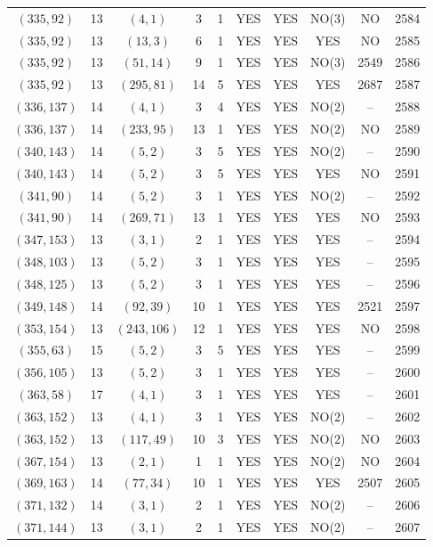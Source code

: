 \begin{longtable}{|c|c|c|c|c|c|c|c|c|c|}
$(335, 92)$ & 13 & $(4, 1)$ & 3 & 1 & YES & YES & NO(3) & NO & 2584\\
$(335, 92)$ & 13 & $(13, 3)$ & 6 & 1 & YES & YES & YES & NO & 2585\\
$(335, 92)$ & 13 & $(51, 14)$ & 9 & 1 & YES & YES & NO(3) & 2549 & 2586\\
$(335, 92)$ & 13 & $(295, 81)$ & 14 & 5 & YES & YES & YES & 2687 & 2587\\
$(336, 137)$ & 14 & $(4, 1)$ & 3 & 4 & YES & YES & NO(2) & -- & 2588\\
$(336, 137)$ & 14 & $(233, 95)$ & 13 & 1 & YES & YES & NO(2) & NO & 2589\\
$(340, 143)$ & 14 & $(5, 2)$ & 3 & 5 & YES & YES & NO(2) & -- & 2590\\
$(340, 143)$ & 14 & $(5, 2)$ & 3 & 5 & YES & YES & YES & NO & 2591\\
$(341, 90)$ & 14 & $(5, 2)$ & 3 & 1 & YES & YES & NO(2) & -- & 2592\\
$(341, 90)$ & 14 & $(269, 71)$ & 13 & 1 & YES & YES & YES & NO & 2593\\
$(347, 153)$ & 13 & $(3, 1)$ & 2 & 1 & YES & YES & YES & -- & 2594\\
$(348, 103)$ & 13 & $(5, 2)$ & 3 & 1 & YES & YES & YES & -- & 2595\\
$(348, 125)$ & 13 & $(5, 2)$ & 3 & 1 & YES & YES & YES & -- & 2596\\
$(349, 148)$ & 14 & $(92, 39)$ & 10 & 1 & YES & YES & YES & 2521 & 2597\\
$(353, 154)$ & 13 & $(243, 106)$ & 12 & 1 & YES & YES & YES & NO & 2598\\
$(355, 63)$ & 15 & $(5, 2)$ & 3 & 5 & YES & YES & YES & -- & 2599\\
$(356, 105)$ & 13 & $(5, 2)$ & 3 & 1 & YES & YES & YES & -- & 2600\\
$(363, 58)$ & 17 & $(4, 1)$ & 3 & 1 & YES & YES & YES & -- & 2601\\
$(363, 152)$ & 13 & $(4, 1)$ & 3 & 1 & YES & YES & NO(2) & -- & 2602\\
$(363, 152)$ & 13 & $(117, 49)$ & 10 & 3 & YES & YES & NO(2) & NO & 2603\\
$(367, 154)$ & 13 & $(2, 1)$ & 1 & 1 & YES & YES & NO(2) & NO & 2604\\
$(369, 163)$ & 14 & $(77, 34)$ & 10 & 1 & YES & YES & YES & 2507 & 2605\\
$(371, 132)$ & 14 & $(3, 1)$ & 2 & 1 & YES & YES & NO(2) & -- & 2606\\
$(371, 144)$ & 13 & $(3, 1)$ & 2 & 1 & YES & YES & NO(2) & -- & 2607\\

\end{longtable}
